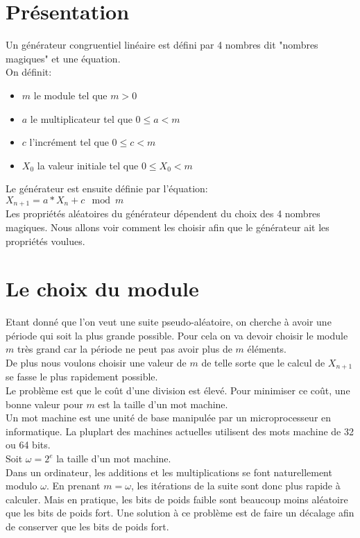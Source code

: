 \documentclass[a4paper,11pt]{report}
\begin{document}
	\section{Pr\'esentation}
	Un g\'en\'erateur congruentiel lin\'eaire est d\'efini par 4 nombres dit "nombres magiques" et %
	une \'equation.\\
	On d\'efinit: \\
	\begin{itemize}
	\item $m$ le module tel que $m>0$
	\item $a$ le multiplicateur tel que $0\leq a <m$
	\item $c$ l'incr\'ement tel que $0\leq c <m$
	\item $X_{0}$ la valeur initiale tel que $0\leq X_{0} <m$\\
	\end{itemize}	 	
	Le g\'en\'erateur est ensuite d\'efinie par l'\'equation:\\
	$X_{n+1} = a*X_{n} + c \mod{m}$ \\
		Les propri\'et\'es al\'eatoires du g\'en\'erateur d\'ependent du choix des 4 nombres magiques. Nous %
		allons voir 	comment les choisir afin que le g\'en\'erateur ait les propri\'et\'es voulues.
		
	\section{Le choix du module}
	Etant donn\'e que l'on veut une suite pseudo-al\'eatoire, on cherche \`a avoir une p\'eriode %
	qui soit la plus grande possible. Pour cela on va devoir choisir le module $m$ tr\`es %
	grand car la p\'eriode ne peut pas avoir plus de $m$ \'el\'ements. \\
	De plus nous voulons choisir une valeur de $m$ de telle sorte que le calcul de %
	$X_{n+1}$ se fasse le plus rapidement possible. \\
	
	
	Le probl\`eme est que le co\^ut d'une division est \'elev\'e. Pour minimiser ce co\^ut, une bonne %
	valeur pour $m$ est la taille d'un mot machine. \\
	Un mot machine est une unit\'e de base manipul\'ee par un microprocesseur en informatique. %
	La pluplart des machines actuelles utilisent des mots machine de 32 ou 64 bits.\\
	Soit $\omega=2^{e}$ la taille d'un mot machine. \\
	Dans un ordinateur, les additions et les multiplications se font naturellement modulo %
	$\omega$. En prenant $m=\omega$, les it\'erations de la suite sont donc plus rapide %
	\`a calculer.
	Mais en pratique, les bits de poids faible sont beaucoup moins al\'eatoire que les bits de %
	poids fort. Une solution \`a ce probl\`eme est de faire un d\'ecalage afin de conserver que %
	les bits de poids fort.
	
\end{document}
